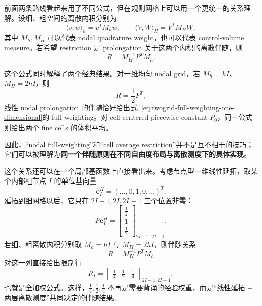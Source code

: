 前面两条路线看起来用了不同公式，但在规则网格上可以用一个更统一的关系理解。设细、粗空间的离散内积分别为
\begin{equation}
\langle v,w\rangle_h=v^TM_hw,
\qquad
\langle V,W\rangle_H=V^TM_HW,
\end{equation}
其中 $M_h,M_H$ 可以代表 nodal quadrature weight，也可以代表 control-volume measure。若希望 restriction 是 prolongation 关于这两个内积的离散伴随，则
\begin{equation}
\boxed{
R=M_H^{-1}P^TM_h.
}
\label{eq:twogrid-weighted-adjoint-transfer}
\end{equation}

这个公式同时解释了两个经典结果。对一维均匀 nodal grid，若 $M_h=hI$、$M_H=2hI$，则
\begin{equation}
R=\frac12P^T,
\end{equation}
线性 nodal prolongation 的伴随恰好给出式~\eqref{eq:twogrid-full-weighting-one-dimensional}的 full-weighting。对 cell-centered piecewise-constant $P_0$，同一公式则给出两个 fine cells 的体积平均。

因此，“nodal full-weighting”和“cell average restriction”并不是互不相干的技巧；它们可以被理解为\textbf{同一个伴随原则在不同自由度布局与离散测度下的具体实现}。

这个关系还可以在一个局部基函数上直接看出来。考虑节点型一维线性延拓，取某个内部粗节点 $I$ 的单位基向量
\begin{equation}
\bm e_I^H=(\ldots,0,1,0,\ldots)^T.
\end{equation}
延拓到细网格以后，它只在 $2I-1,2I,2I+1$ 三个位置非零：
\begin{equation}
P\bm e_I^H
=
\begin{bmatrix}
\frac12\\[0.2em]
1\\[0.2em]
\frac12
\end{bmatrix}_{2I-1:2I+1}.
\label{eq:twogrid-local-prolongation-basis}
\end{equation}
若细、粗离散内积分别取 $M_h=hI$ 与 $M_H=2hI$，则伴随关系
\begin{equation}
R=M_H^{-1}P^TM_h
\end{equation}
对这一列直接给出限制行
\begin{equation}
\boxed{
R_I
=
\begin{bmatrix}
\frac14&
\frac12&
\frac14
\end{bmatrix}_{2I-1:2I+1},
}
\label{eq:twogrid-local-adjoint-row}
\end{equation}
也就是全加权公式。这样，$\frac14,\frac12,\frac14$ 不再是需要背诵的经验权重，而是“线性延拓 + 两层离散测度”共同决定的伴随结果。

